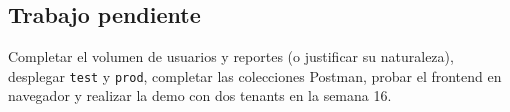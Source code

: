 \subsection{Trabajo pendiente}
Completar el volumen de usuarios y reportes (o justificar su naturaleza), desplegar \texttt{test} y \texttt{prod}, completar las colecciones Postman, probar el frontend en navegador y realizar la demo con dos tenants en la semana 16.
